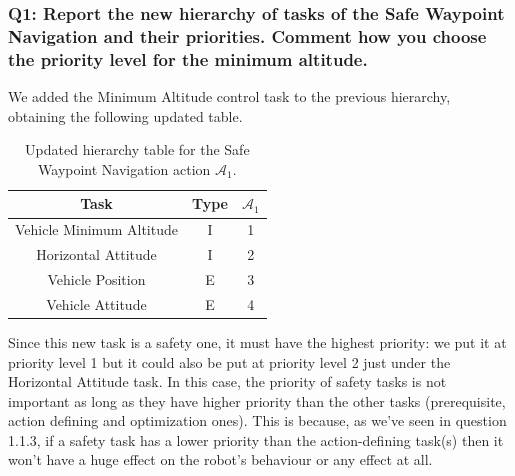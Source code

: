 \documentclass{article}
\begin{document}
\subsubsection{Q1: Report the new hierarchy of tasks of the Safe Waypoint Navigation and their priorities. Comment how you choose the priority level for the minimum altitude.}
We added the Minimum Altitude control task to the previous hierarchy, obtaining the following updated table.
\begin{table}[htb]
	\caption{Updated hierarchy table for the Safe Waypoint Navigation action $\mathcal{A}_{1}$.}
	\label{tb2:ex1.2.1SafeWaypointNavigationTable}
	\begin{center}
		\footnotesize
		\begin{tabular}{ccc}
			\toprule
			Task & Type & $\mathcal{A}_{1}$ \\
			\midrule
			Vehicle Minimum Altitude & I & 1 \\
			\hdashline
			Horizontal Attitude      & I & 2 \\
			\hdashline
			Vehicle Position 	     & E & 3 \\
			\hdashline
			Vehicle Attitude         & E & 4 \\
			\bottomrule
		\end{tabular}
	\end{center}
\end{table}
Since this new task is a safety one, it must have the highest priority: we put it at priority level 1 but it could also be put at priority level 2 just under the Horizontal Attitude task. In this case, the priority of safety tasks is not important as long as they have higher priority than the other tasks (prerequisite, action defining and optimization ones). This is because, as we've seen in question 1.1.3, if a safety task has a lower priority than the action-defining task(s) then it won't have a huge effect on the robot's behaviour or any effect at all.
\end{document}
